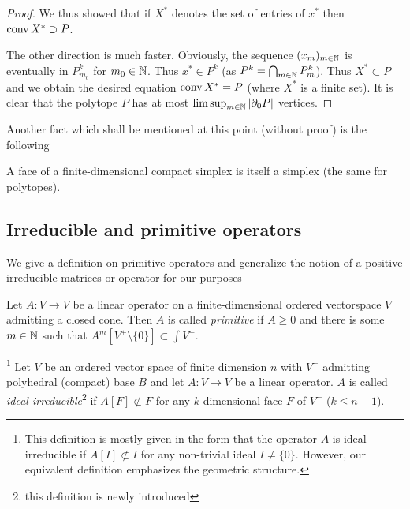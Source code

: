\documentclass{article}
\begin{document}
\begin{proof}
We thus showed that if $X^*$ denotes the set of entries of $x^*$ then $\operatorname{conv} X^* \supset P$.

The other direction is much faster. Obviously, the sequence $(x_m)_{m\in\mathbb{N}}$ is eventually in $P_{m_0}^k$ for $m_0\in\mathbb{N}$. Thus $x^*\in P^k$ (as $P^k = \bigcap_{m\in\mathbb{N}}{P_m^k}$). Thus $X^*\subset P$ and we obtain the desired equation $\operatorname{conv} X^* = P$ (where $X^*$ is a finite set). It is clear that the polytope $P$ has at most $\limsup_{m\in\mathbb{N}}|\partial_0{P}|$ vertices. 

\end{proof}

Another fact which shall be mentioned at this point (without proof) is the following

\begin{lemma}
A face of a finite-dimensional compact simplex is itself a simplex (the same for polytopes).
\end{lemma}

\subsection{Irreducible and primitive operators}

We give a definition on primitive operators and generalize the notion of a positive irreducible matrices or operator for our purposes

\begin{definition}\label{def5}
Let $A:V\to V$ be a linear operator on a finite-dimensional ordered vectorspace $V$ admitting a closed cone. Then $A$ is called \emph{primitive} if $A\geq 0$ and there is some $m\in\mathbb{N}$ such that $A^m[V^+\setminus\{0\}]\subset\int V^+$. 
\end{definition}

\begin{definition}\label{def6}\footnote{This definition is mostly given in the form that the operator $A$ is ideal irreducible if $A[I]\not\subset I$ for any non-trivial ideal $I\neq\{0\}$. However, our equivalent definition emphasizes the geometric structure.}
Let $V$ be an ordered vector space of finite dimension $n$ with $V^+$ admitting polyhedral (compact) base $B$ and let $A:V\to V$ be a linear operator.
$A$ is called \emph{ideal irreducible}\footnote{this definition is newly introduced} if $A[F]\not\subset F$ for any $k$-dimensional face $F$ of $V^+$ ($k\leq n-1$).
\end{definition}
\end{document}
